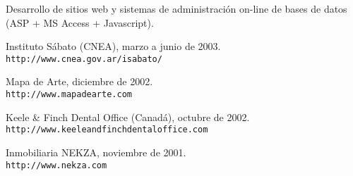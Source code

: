 
\item Desarrollo de sitios web y sistemas de administraci\'on
on-line de bases de datos (ASP + MS Access + Javascript).


\begin{compactitem}

\item Instituto S\'abato (CNEA), marzo a junio de 2003. \\
{\tt http://www.cnea.gov.ar/isabato/}


\item Mapa de Arte, diciembre de 2002. \\
{\tt http://www.mapadearte.com}

\item Keele \& Finch Dental Office (Canad\'a), octubre de 2002. \\
{\tt http://www.keeleandfinchdentaloffice.com}

\item Inmobiliaria NEKZA, noviembre de 2001. \\
{\tt http://www.nekza.com}



\end{compactitem}
